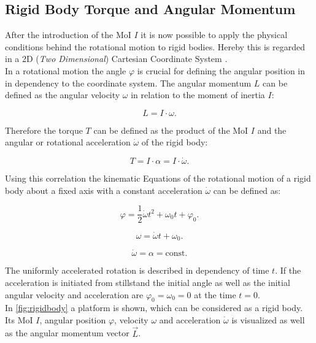 \subsection{Rigid Body Torque and Angular Momentum}
\label{sec:rotation}
After the introduction of the MoI $I$ it is now possible to apply the physical conditions behind the rotational motion to rigid bodies. Hereby this is regarded in a 2D (\textit{Two Dimensional}) Cartesian Coordinate System \cite{Karaoglu.2020}\cite{Demtroder.2017}.\\

In a rotational motion the angle $\varphi$ is crucial for defining the angular position in in dependency to the coordinate system. The angular momentum $L$ can be defined as the angular velocity $\omega$ in relation to the moment of inertia $I$:

\begin{equation}
L = I \cdot \omega .
\label{eqn:omega}
\end{equation}

Therefore the torque $T$ can be defined as the product of the MoI $I$ and the angular or rotational acceleration $\dot{\omega}$ of the rigid body:

\begin{equation}
T = I \cdot \alpha =I \cdot \dot{\omega} .
\label{eqn:omegadot}
\end{equation}

Using this correlation the kinematic Equations of the rotational motion of a rigid body about a fixed axis with a constant acceleration $\dot{\omega}$ can be defined as:

\begin{equation}
\varphi = \dfrac{1}{2} \dot{\omega} t^{2} + \omega_{0} t + \varphi_{0}.
\label{eqn:rot1}
\end{equation}

\begin{equation}
\omega = \dot{\omega} t + \omega_{0}.
\label{eqn:rot2}
\end{equation}

\begin{equation}
\dot{\omega} = \alpha = \text{const}.
\label{eqn:rot3}
\end{equation}

\raggedbottom

The uniformly accelerated rotation is described in dependency of time $t$. If the acceleration is initiated from stillstand the initial angle as well as the initial angular velocity and acceleration are $\varphi_{0} = \omega_{0} = 0$ at the time $t = 0$.\\
In \autoref{fig:rigidbody} a platform is shown, which can be considered as a rigid body. Its MoI $I$, angular position $\varphi$, velocity $\omega$ and acceleration $\dot{\omega}$ is visualized as well as the angular momentum vector $\vec{L}$.\\




